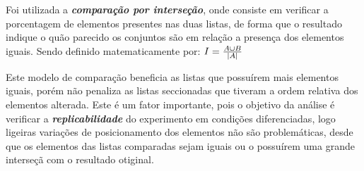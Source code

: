 
Foi utilizada a \textsl{\textbf{comparação por interseção}}, onde consiste em verificar a porcentagem de elementos presentes nas duas listas, de forma que o resultado indique o quão parecido os conjuntos são em relação a presença dos elementos iguais.
Sendo definido matematicamente por: 
$I = {{A \cup B} \over |A|}$

Este modelo de comparação beneficia as listas que possuírem mais elementos iguais, porém não penaliza as listas seccionadas que tiveram a ordem relativa dos elementos alterada. Este é um fator importante, pois o objetivo da análise é verificar a \textsl{\textbf{replicabilidade}} do experimento em condições diferenciadas, logo ligeiras variações de posicionamento dos elementos não são problemáticas, desde que os elementos das listas comparadas sejam iguais ou o possuírem uma grande interseçã com o resultado otiginal.


